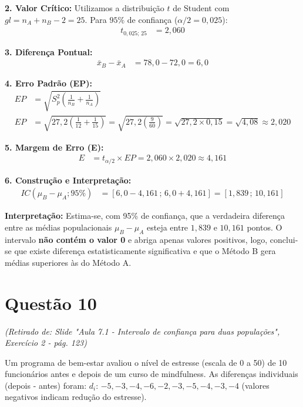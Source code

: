 \documentclass[12pt, a4paper]{article}
\begin{document}
\noindent \textbf{2. Valor Crítico:}
Utilizamos a distribuição $t$ de Student com $gl = n_A + n_B - 2 = 25$. Para $95\%$ de confiança ($\alpha/2 = 0{,}025$):
\begin{align*}
t_{0{,}025; \, 25} &= \boxed{2{,}060}
\end{align*}

\noindent \textbf{3. Diferença Pontual:}
\begin{align*}
\bar{x}_B - \bar{x}_A &= 78{,}0 - 72{,}0 = \boxed{6{,}0}
\end{align*}

\noindent \textbf{4. Erro Padrão (EP):}
\begin{align*}
EP &= \sqrt{S^2_p \left( \frac{1}{n_B} + \frac{1}{n_A} \right)} \\
EP &= \sqrt{27{,}2 \left( \frac{1}{12} + \frac{1}{15} \right)} = \sqrt{27{,}2 \left( \frac{9}{60} \right)} = \sqrt{27{,}2 \times 0{,}15} = \sqrt{4{,}08} \approx \boxed{2{,}020}
\end{align*}

\noindent \textbf{5. Margem de Erro (E):}
\begin{align*}
E &= t_{\alpha/2} \times EP = 2{,}060 \times 2{,}020 \approx \boxed{4{,}161}
\end{align*}

\noindent \textbf{6. Construção e Interpretação:}
\begin{align*}
IC(\mu_B - \mu_A; 95\%) &= [6{,}0 - 4{,}161 \,;\, 6{,}0 + 4{,}161] = \boxed{[1{,}839 \,;\, 10{,}161]}
\end{align*}

\noindent \textbf{Interpretação:} Estima-se, com 95\% de confiança, que a verdadeira diferença entre as médias populacionais $\mu_B - \mu_A$ esteja entre $1{,}839$ e $10{,}161$ pontos. O intervalo \textbf{não contém o valor 0} e abriga apenas valores positivos, logo, conclui-se que existe diferença estatisticamente significativa e que o Método B gera médias superiores às do Método A.

\section*{Questão 10}
\textit{(Retirado de: Slide "Aula 7.1 - Intervalo de confiança para duas populações", Exercício 2 - pág. 123)}

Um programa de bem-estar avaliou o nível de estresse (escala de 0 a 50) de 10 funcionários antes e depois de um curso de mindfulness. As diferenças individuais (depois - antes) foram:
$d_i$: $-5, -3, -4, -6, -2, -3, -5, -4, -3, -4$
(valores negativos indicam redução do estresse).
\end{document}
